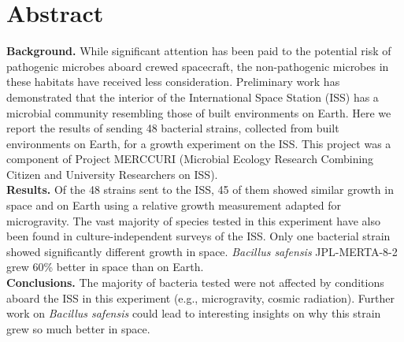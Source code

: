 \section{Abstract}

\textbf{Background.} While significant attention has been paid to the potential risk of pathogenic microbes aboard crewed spacecraft, the non-pathogenic microbes in these habitats have received less consideration. Preliminary work has demonstrated that the interior of the International Space Station (ISS) has a microbial community resembling those of built environments on Earth. Here we report the results of sending 48 bacterial strains, collected from built environments on Earth, for a growth experiment on the ISS. This project was a component of Project MERCCURI (Microbial Ecology Research Combining Citizen and University Researchers on ISS).\\
\textbf{Results.} Of the 48 strains sent to the ISS, 45 of them showed similar growth in space and on Earth using a relative growth measurement adapted for microgravity. The vast majority of species tested in this experiment have also been found in culture-independent surveys of the ISS. Only one bacterial strain showed significantly different growth in space. \textit{Bacillus safensis} JPL-MERTA-8-2 grew 60\% better in space than on Earth.\\
\textbf{Conclusions.} The majority of bacteria tested were not affected by conditions aboard the ISS in this experiment (e.g., microgravity, cosmic radiation). Further work on \textit{Bacillus safensis} could lead to interesting insights on why this strain grew so much better in space.